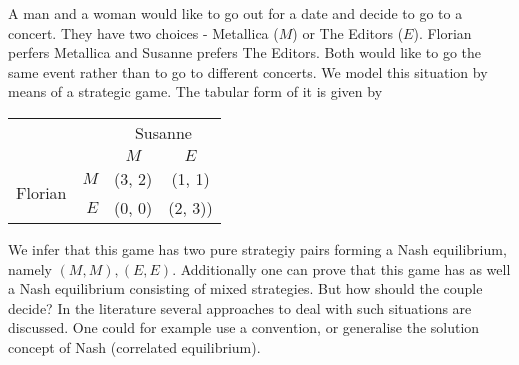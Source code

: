 
\begin{example}
    A man and a woman would like to go out for a date and decide to go to a concert. They have two choices - Metallica ($M$) or The Editors ($E$). Florian perfers 
    Metallica and Susanne prefers The Editors. Both would like to go the same event rather than to go to different concerts. We model this situation by means
    of a strategic game. The tabular form of it is given by
    \begin{center}
        \begin{tabular}{c | r | c | c |}
            \multicolumn{2}{c}{} & \multicolumn{2}{c}{Susanne}\\
            \cline{2-4}
            & & $M$ & $E$ \\
            \cline{2-4}
            \multirow{2}{*}{Florian} & $M$ & (3, 2) & (1, 1) \\
            \cline{2-4}
            & $E$ & (0, 0) & (2, 3)) \\
            \cline{2-4}
        \end{tabular}            
    \end{center}
    We infer that this game has two pure strategiy pairs forming a Nash equilibrium, namely $(M, M), (E, E)$. Additionally one can prove that this
    game has as well a Nash equilibrium consisting of mixed strategies. But how should the couple decide? In the literature several approaches to 
    deal with such situations are discussed. One could for example use a convention, or generalise the solution concept of Nash (correlated equilibrium).
\end{example}